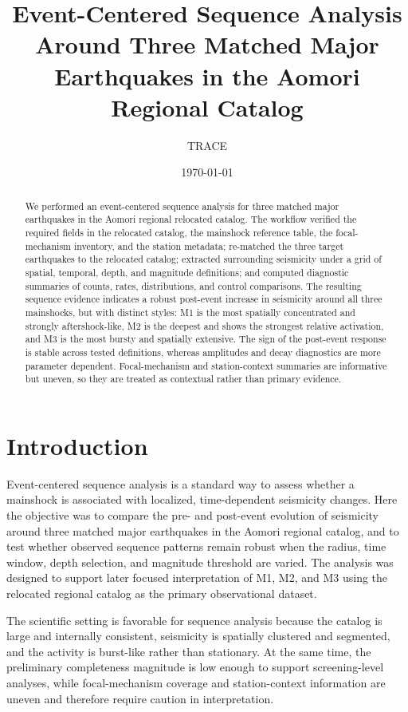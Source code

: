 \documentclass[11pt]{article}
\title{Event-Centered Sequence Analysis Around Three Matched Major Earthquakes in the Aomori Regional Catalog}
\author{TRACE}
\date{\today}
\begin{document}
\maketitle

\begin{abstract}
We performed an event-centered sequence analysis for three matched major earthquakes in the Aomori regional relocated catalog. The workflow verified the required fields in the relocated catalog, the mainshock reference table, the focal-mechanism inventory, and the station metadata; re-matched the three target earthquakes to the relocated catalog; extracted surrounding seismicity under a grid of spatial, temporal, depth, and magnitude definitions; and computed diagnostic summaries of counts, rates, distributions, and control comparisons. The resulting sequence evidence indicates a robust post-event increase in seismicity around all three mainshocks, but with distinct styles: M1 is the most spatially concentrated and strongly aftershock-like, M2 is the deepest and shows the strongest relative activation, and M3 is the most bursty and spatially extensive. The sign of the post-event response is stable across tested definitions, whereas amplitudes and decay diagnostics are more parameter dependent. Focal-mechanism and station-context summaries are informative but uneven, so they are treated as contextual rather than primary evidence.
\end{abstract}

\section{Introduction}
Event-centered sequence analysis is a standard way to assess whether a mainshock is associated with localized, time-dependent seismicity changes. Here the objective was to compare the pre- and post-event evolution of seismicity around three matched major earthquakes in the Aomori regional catalog, and to test whether observed sequence patterns remain robust when the radius, time window, depth selection, and magnitude threshold are varied. The analysis was designed to support later focused interpretation of M1, M2, and M3 using the relocated regional catalog as the primary observational dataset.

The scientific setting is favorable for sequence analysis because the catalog is large and internally consistent, seismicity is spatially clustered and segmented, and the activity is burst-like rather than stationary. At the same time, the preliminary completeness magnitude is low enough to support screening-level analyses, while focal-mechanism coverage and station-context information are uneven and therefore require caution in interpretation.
\end{document}
